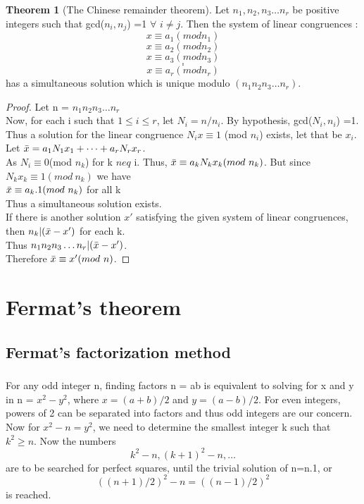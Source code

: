 \documentclass[15,a4paper]{report}
\theoremstyle{definition}
\newtheorem{theorem}{Theorem}[section]
\theoremstyle{remark}
\begin{document}
        \begin{theorem}[The Chinese remainder theorem]
            Let $n_1, n_2, n_3 \dots n_r$ be positive integers such that gcd($n_i,n_j$) =1 $\forall$ $i\neq j$. Then the system of linear congruences :
            \[ x \equiv a_1 (mod n_1)\]
            \[ x \equiv a_2 (mod n_2)\]
            \[ x \equiv a_3 (mod n_3)\]
            \[.\]
            \[.\]
            \[ x \equiv a_r (mod n_r)\]
            has a simultaneous solution which is unique modulo $(n_1 n_2 n_3 \dots n_r)$.
        \end{theorem}
            \begin{proof}
                Let n = $n_1 n_2 n_3 \dots n_r$\\
                Now, for each i such that $1\leq i \leq r$, let $N_i = n/n_i$. By hypothesis, gcd($N_i,n_i$) =1. Thus a solution for the linear congruence $ N_i x \equiv 1$ (mod $n_i$) exists, let that be $x_i$.\\
                Let $\Bar{x} = a_1 N_1 x_1 + \dots + a_r N_r x_r$.\\
                As $N_i \equiv 0$(mod $n_k$) for k $neq$ i. Thus, $\Bar{x} \equiv a_k N_k x_k (mod ~n_k)$. But since $N_k x_k \equiv 1 (mod ~ n_k)$ we have \\
                $\Bar{x} \equiv a_k . 1 (mod ~n_k)$ for all k\\
                Thus a simultaneous solution exists.\\
                If there is another solution $x'$ satisfying the given system of linear congruences, then $n_k|(\Bar{x} - x')$ for each k.\\ 
                Thus $n_1 n_2 n_3 \dots n_r |(\Bar{x} - x')$.\\
                Therefore $\Bar{x} \equiv x' (mod ~n)$.
            \end{proof}
            
    


\chapter{Fermat's theorem}
    \section{Fermat's factorization method}
        \paragraph{} For any odd integer n, finding factors n = ab is equivalent to solving for x and y in n = $x^2 - y^2$, where $x = (a + b)/2$ and $y=(a-b)/2$. For even integers, powers of 2 can be separated into factors and thus odd integers are our concern.\\
        Now for $x^2 -n = y^2$, we need to determine the smallest integer k such that $k^2 \geq n$. Now the numbers \[ k^2 -n , (k+1)^2 -n , \dots \] are to be searched for perfect squares, until the trivial solution of n=n.1, or \[ ((n+1)/2)^2 - n = ((n-1)/2)^2 \] is reached.
    
\end{document}
